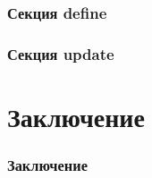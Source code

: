 \documentclass[utf8,handout]{beamer}
\begin{document}
		\begin{frame}
 			\frametitle{Секция define}
		\end{frame}
	
		\begin{frame}
 			\frametitle{Секция update}
		\end{frame}
	
\section{Заключение}
	\begin{frame}
		\frametitle{Заключение}
	\end{frame}
	
\end{document}
